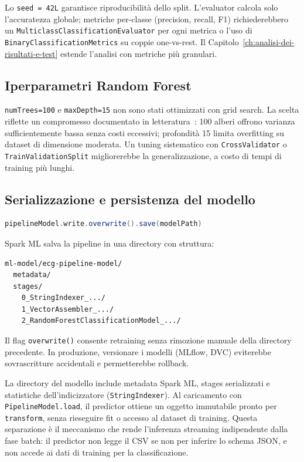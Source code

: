 Lo \texttt{seed = 42L} garantisce riproducibilità dello split.
L'evaluator calcola solo l'accuratezza globale; metriche per-classe (precision, recall, F1) richiederebbero un \texttt{MulticlassClassificationEvaluator} per ogni metrica o l'uso di \texttt{BinaryClassificationMetrics} su coppie one-vs-rest.
Il Capitolo~\ref{ch:analisi-dei-risultati-e-test} estende l'analisi con metriche più granulari.

\subsection{Iperparametri Random Forest}

\texttt{numTrees=100} e \texttt{maxDepth=15} non sono stati ottimizzati con grid search.
La scelta riflette un compromesso documentato in letteratura~\cite{breiman2001random}: 100 alberi offrono varianza sufficientemente bassa senza costi eccessivi; profondità 15 limita overfitting su dataset di dimensione moderata.
Un tuning sistematico con \texttt{CrossValidator} o \texttt{TrainValidationSplit} migliorerebbe la generalizzazione, a costo di tempi di training più lunghi.

\subsection{Serializzazione e persistenza del modello}\label{subsec:serializzazione}

\begin{lstlisting}[language=Scala,caption={Salvataggio pipeline su filesystem.},label={lst:save-model}]
pipelineModel.write.overwrite().save(modelPath)
\end{lstlisting}

Spark ML salva la pipeline in una directory con struttura:

\begin{verbatim}
ml-model/ecg-pipeline-model/
  metadata/
  stages/
    0_StringIndexer_.../
    1_VectorAssembler_.../
    2_RandomForestClassificationModel_.../
\end{verbatim}

Il flag \texttt{overwrite()} consente retraining senza rimozione manuale della directory precedente.
In produzione, versionare i modelli (MLflow, DVC) eviterebbe sovrascritture accidentali e permetterebbe rollback.

La directory del modello include metadata Spark ML, stages serializzati e statistiche dell'indicizzatore (\texttt{StringIndexer}).
Al caricamento con \texttt{PipelineModel.load}, il predictor ottiene un oggetto immutabile pronto per \texttt{transform}, senza rieseguire fit o accesso al dataset di training.
Questa separazione è il meccanismo che rende l'inferenza streaming indipendente dalla fase batch: il predictor non legge il CSV se non per inferire lo schema JSON, e non accede ai dati di training per la classificazione.

